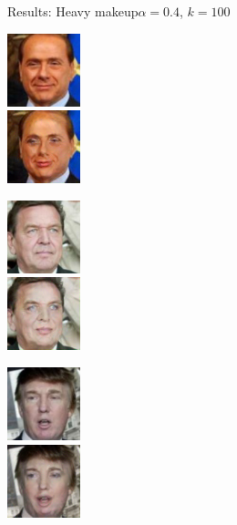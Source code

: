 \documentclass[11pt]{beamer}
\begin{document}
\begin{frame}{Results: Heavy makeup}{$\alpha=0.4$, $k=100$}
	\centering
	\begin{minipage}{81px}
		\includegraphics[width=80px]{../pictures/outputs/start-imgs/Berlusconi.png}\\
		\includegraphics[width=80px]{../pictures/outputs/heavy_makeup_alpha0.4_k100/Berlusconi.png}
	\end{minipage}%
	\begin{minipage}{81px}
		\includegraphics[width=80px]{../pictures/outputs/start-imgs/Schroeder.png}\\
		\includegraphics[width=80px]{../pictures/outputs/heavy_makeup_alpha0.4_k100/Schroeder.png}
	\end{minipage}%
	\begin{minipage}{81px}
		\includegraphics[width=80px]{../pictures/outputs/start-imgs/Trump.png}\\
		\includegraphics[width=80px]{../pictures/outputs/heavy_makeup_alpha0.4_k100/Trump.png}

\end{minipage}
\end{frame}
\end{document}
